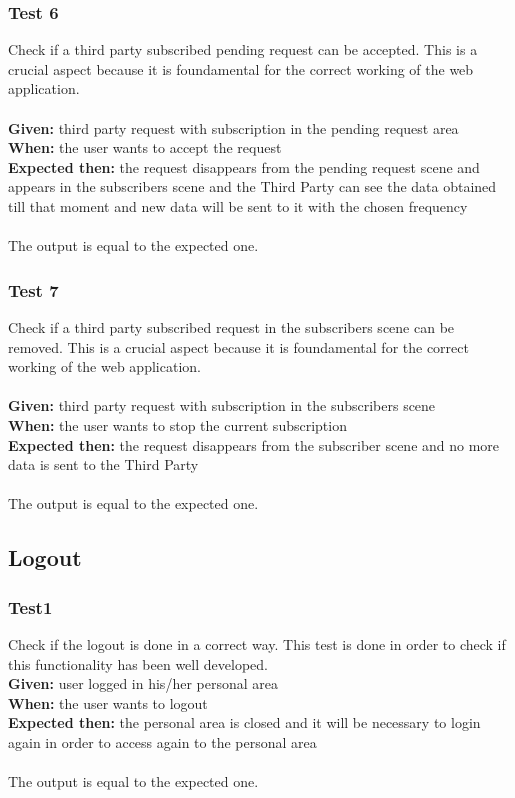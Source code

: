 \subsubsection{\Large{Test 6}}
Check if a third party subscribed pending request can be accepted. This is a crucial aspect because it is foundamental for the correct working of the web application.\\
\\
\textbf{Given: }  third party request with subscription in the pending request area\\
\textbf{When: } the user wants to accept the request\\
\textbf{Expected then: } the request disappears from the pending request scene and appears in the subscribers scene and the Third Party can see the data obtained till that moment and new data will be sent to it with the chosen frequency \\
\\
The output is equal to the expected one.

\subsubsection{\Large{Test 7}}
Check if a third party subscribed request in the subscribers scene can be removed. This is a crucial aspect because it is foundamental for the correct working of the web application.\\
\\
\textbf{Given: }  third party request with subscription in the subscribers scene\\
\textbf{When: } the user wants to stop the current subscription\\
\textbf{Expected then: } the request disappears from the subscriber scene and no more data is sent to the Third Party \\
\\
The output is equal to the expected one.

\subsection{Logout}

\subsubsection{\Large{Test1}}
Check if the logout is done in a correct way. This test is done in order to check if this functionality has been well developed.
\\
\textbf{Given: }  user logged in his/her personal area\\
\textbf{When: } the user wants to logout\\
\textbf{Expected then: } the personal area is closed and it will be necessary to login again in order to access again to the personal area \\
\\
The output is equal to the expected one.